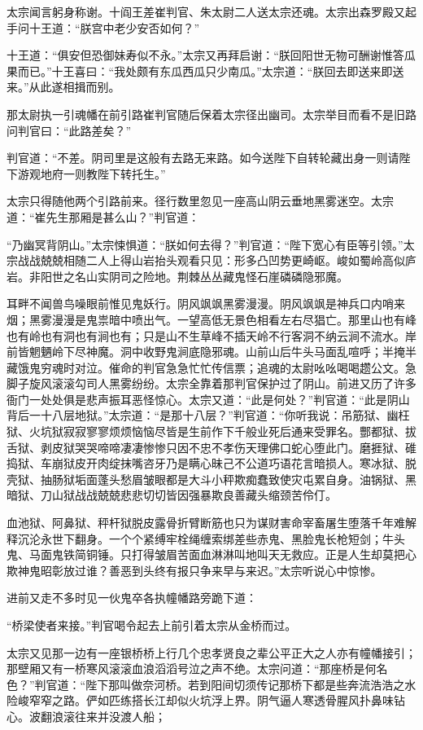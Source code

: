 \documentclass[12pt,UTF8]{ctexbook}
\begin{document}
{太宗闻言躬身称谢。十阎王差崔判官、朱太尉二人送太宗还魂。太宗出森罗殿又起手问十王道：“朕宫中老少安否如何？”

十王道：“俱安但恐御妹寿似不永。”太宗又再拜启谢：“朕回阳世无物可酬谢惟答瓜果而已。”十王喜曰：“我处颇有东瓜西瓜只少南瓜。”太宗道：“朕回去即送来即送来。”从此遂相揖而别。

那太尉执一引魂幡在前引路崔判官随后保着太宗径出幽司。太宗举目而看不是旧路问判官曰：“此路差矣？”

判官道：“不差。阴司里是这般有去路无来路。如今送陛下自转轮藏出身一则请陛下游观地府一则教陛下转托生。”

太宗只得随他两个引路前来。径行数里忽见一座高山阴云垂地黑雾迷空。太宗道：“崔先生那厢是甚么山？”判官道：

“乃幽冥背阴山。”太宗悚惧道：“朕如何去得？”判官道：“陛下宽心有臣等引领。”太宗战战兢兢相随二人上得山岩抬头观看只见：形多凸凹势更崎岖。峻如蜀岭高似庐岩。非阳世之名山实阴司之险地。荆棘丛丛藏鬼怪石崖磷磷隐邪魔。

耳畔不闻兽鸟噪眼前惟见鬼妖行。阴风飒飒黑雾漫漫。阴风飒飒是神兵口内哨来烟；黑雾漫漫是鬼祟暗中喷出气。一望高低无景色相看左右尽猖亡。那里山也有峰也有岭也有洞也有涧也有；只是山不生草峰不插天岭不行客洞不纳云涧不流水。岸前皆魍魉岭下尽神魔。洞中收野鬼涧底隐邪魂。山前山后牛头马面乱喧呼；半掩半藏饿鬼穷魂时对泣。催命的判官急急忙忙传信票；追魂的太尉吆吆喝喝趱公文。急脚子旋风滚滚勾司人黑雾纷纷。太宗全靠着那判官保护过了阴山。前进又历了许多衙门一处处俱是悲声振耳恶怪惊心。太宗又道：“此是何处？”判官道：“此是阴山背后一十八层地狱。”太宗道：“是那十八层？”判官道：“你听我说：吊筋狱、幽枉狱、火坑狱寂寂寥寥烦烦恼恼尽皆是生前作下千般业死后通来受罪名。酆都狱、拔舌狱、剥皮狱哭哭啼啼凄凄惨惨只因不忠不孝伤天理佛口蛇心堕此门。磨捱狱、碓捣狱、车崩狱皮开肉绽抹嘴咨牙乃是瞒心昧己不公道巧语花言暗损人。寒冰狱、脱壳狱、抽肠狱垢面蓬头愁眉皱眼都是大斗小秤欺痴蠢致使灾屯累自身。油锅狱、黑暗狱、刀山狱战战兢兢悲悲切切皆因强暴欺良善藏头缩颈苦伶仃。

血池狱、阿鼻狱、秤杆狱脱皮露骨折臂断筋也只为谋财害命宰畜屠生堕落千年难解释沉沦永世下翻身。一个个紧缚牢栓绳缠索绑差些赤鬼、黑脸鬼长枪短剑；牛头鬼、马面鬼铁简铜锤。只打得皱眉苦面血淋淋叫地叫天无救应。正是人生却莫把心欺神鬼昭彰放过谁？善恶到头终有报只争来早与来迟。”太宗听说心中惊惨。

进前又走不多时见一伙鬼卒各执幢幡路旁跪下道：

“桥梁使者来接。”判官喝令起去上前引着太宗从金桥而过。

太宗又见那一边有一座银桥桥上行几个忠孝贤良之辈公平正大之人亦有幢幡接引；那壁厢又有一桥寒风滚滚血浪滔滔号泣之声不绝。太宗问道：“那座桥是何名色？”判官道：“陛下那叫做奈河桥。若到阳间切须传记那桥下都是些奔流浩浩之水险峻窄窄之路。俨如匹练搭长江却似火坑浮上界。阴气逼人寒透骨腥风扑鼻味钻心。波翻浪滚往来并没渡人船；

}
\end{document}
